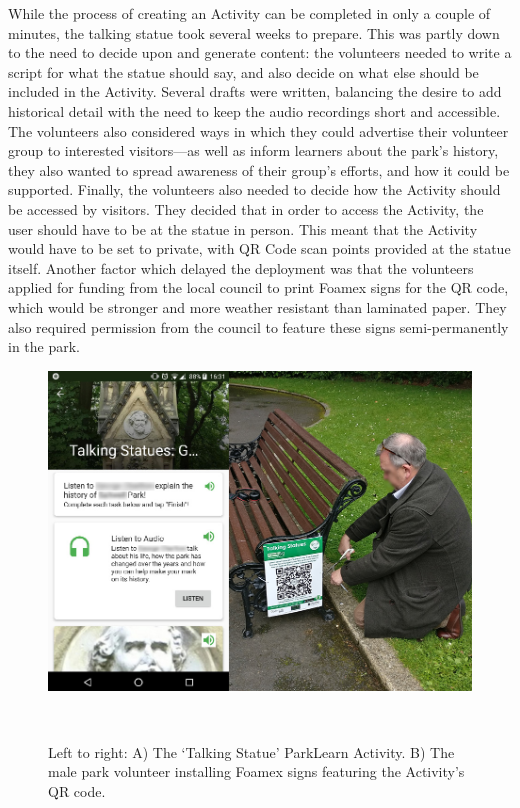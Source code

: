 While the process of creating an Activity can be completed in only a couple of minutes, the talking statue took several weeks to prepare. This was partly down to the need to decide upon and generate content: the volunteers needed to write a script for what the statue should say, and also decide on what else should be included in the Activity. Several drafts were written, balancing the desire to add historical detail with the need to keep the audio recordings short and accessible. The volunteers also considered ways in which they could advertise their volunteer group to interested visitors---as well as inform learners about the park's history, they also wanted to spread awareness of their group's efforts, and how it could be supported. Finally, the volunteers also needed to decide how the Activity should be accessed by visitors. They decided that in order to access the Activity, the user should have to be at the statue in person. This meant that the Activity would have to be set to private, with QR Code scan points provided at the statue itself. Another factor which delayed the deployment was that the volunteers applied for funding from the local council to print Foamex signs for the QR code, which would be stronger and more weather resistant than laminated paper. They also required permission from the council to feature these signs semi-permanently in the park.

\begin{figure}
  \centering
  \includegraphics[width=0.8\columnwidth]{images/chapter06/TalkingStatue2.jpg}
  \caption[The ParkLearn `Talking Statue' Activity, and installing the signage ]{Left to right: A) The `Talking Statue' ParkLearn Activity. B) The male park volunteer installing Foamex signs featuring the Activity's QR code.}~\label{fig:TalkingStatueActivity}
\end{figure}

